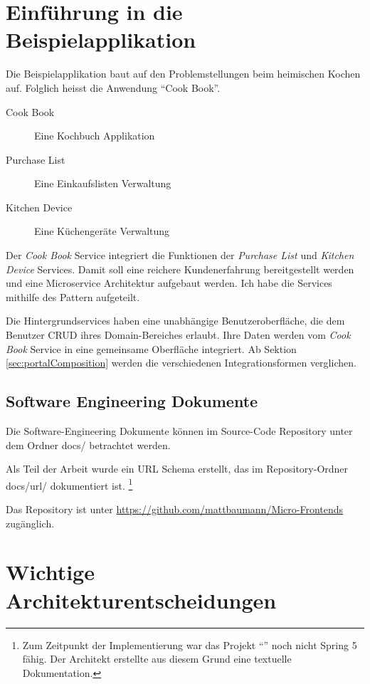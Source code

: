 \section{Einführung in die Beispielapplikation}

Die Beispielapplikation baut auf den Problemstellungen beim heimischen Kochen auf. Folglich heisst die Anwendung \enquote{Cook Book}.

\begin{description}
    \item[Cook Book] Eine Kochbuch Applikation
    \item[Purchase List] Eine Einkaufslisten Verwaltung
    \item[Kitchen Device] Eine Küchengeräte Verwaltung 
\end{description}

Der  \textit{Cook Book} Service integriert die Funktionen der \textit{Purchase List} und \textit{Kitchen Device} Services. Damit soll eine reichere Kundenerfahrung bereitgestellt werden und eine Microservice Architektur aufgebaut werden. Ich habe die Services mithilfe des \cite{RichardsonDecomposeBusiness} Pattern aufgeteilt.

Die  Hintergrundservices haben eine unabhängige Benutzeroberfläche, die dem Benutzer \ac{CRUD} ihres Domain-Bereiches erlaubt. Ihre Daten werden vom \textit{Cook Book} Service in eine gemeinsame Oberfläche integriert. Ab Sektion \ref{sec:portalComposition} werden die verschiedenen Integrationsformen verglichen.

\subsection{Software Engineering Dokumente}
Die Software-Engineering Dokumente können im Source-Code Repository unter dem Ordner docs/ betrachtet werden.

Als Teil der Arbeit wurde ein URL Schema erstellt, das im Repository-Ordner docs/url/ dokumentiert ist. \footnote{Zum Zeitpunkt der Implementierung war das Projekt \enquote{} noch nicht Spring 5 fähig. \cite{Springfox2018} Der Architekt erstellte aus diesem Grund eine textuelle Dokumentation.}

Das Repository ist unter \url{https://github.com/mattbaumann/Micro-Frontends} zugänglich.

\section{Wichtige Architekturentscheidungen} \label{chap:Methology:Application:Entscheide}


